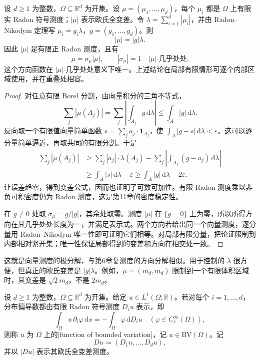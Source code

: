 \begin{proposition}\label{b1:prop:vector-measure-polar}
设 \(d\ge1\) 为整数，\(\Omega\subseteq\mathbb R^d\) 为开集。设 \(\mu=(\mu_1,\ldots,\mu_d)\)，每个 \(\mu_i\) 都是 \(\Omega\) 上有限实 Radon 符号测度；\(|\mu|\) 表示欧氏全变差。令 \(\lambda=\sum_{i=1}^d|\mu_i|\)，并由 Radon–Nikodym 定理写 \(\mu_i=g_i\lambda\)，\(g=(g_1,\ldots,g_d)\)。则
\[
 |\mu|=|g|\lambda.
\]
因此 \(|\mu|\) 是有限正 Radon 测度，且有
\[
 \mu=\sigma_\mu|\mu|,\qquad |\sigma_\mu|=1
 \quad |\mu|\text{-几乎处处}.
\]
这个方向函数在 \(|\mu|\)-几乎处处意义下唯一。上述结论在局部有限情形可逐个内部区域使用，并在重叠处相容。
\end{proposition}
\begin{proof}
对任意有限 Borel 分割，由向量积分的三角不等式，
\[
 \sum_j|\mu(A_j)|=\sum_j\left|\int_{A_j}g\,\mathrm d\lambda\right|
 \le\int_A|g|\,\mathrm d\lambda.
\]
反向取一个有限值向量简单函数 \(s=\sum_j a_j\cdot\mathbf1_{A_j}\)，使
\(\int_A|g-s|\,\mathrm d\lambda<\varepsilon\)。这可以逐分量简单逼近，再取共同的有限分割。于是
\[
 \begin{aligned}
 \sum_j|\mu(A_j)|
 &\ge\sum_j |a_j|\cdot \lambda(A_j)
           -\sum_j\left|\int_{A_j}(g-a_j)\,\mathrm d\lambda\right|\\
 &\ge\int_A|s|\,\mathrm d\lambda-\varepsilon
 \ge\int_A|g|\,\mathrm d\lambda-2\varepsilon.
 \end{aligned}
\]
让误差趋零，得到变差公式，因而也证明了可数可加性。有限 Radon 测度乘以非负可积密度仍为 Radon 测度，这是第11章的密度稳定性。

在 \(g\ne0\) 处取 \(\sigma_\mu=g/|g|\)，其余处取零。测度 \(|\mu|\) 在 \(\{g=0\}\) 上为零，所以所得方向在其几乎处处长度为一，并满足表示式。两个方向若给出同一个向量测度，逐分量用 Radon–Nikodym 唯一性即可证明它们相等。对局部有限分量，把论证限制到内部相对紧开集；唯一性保证局部得到的变差和方向在相交处一致。
\end{proof}

这就是向量测度的极分解，与第6章复测度的方向分解相似。用于控制的 \(\lambda\) 很方便，但真正的欧氏变差是 \(|g|\lambda\)。例如，\(\mu=(m_d,m_d)\) 限制到一个有限体积区域时，其变差是 \(\sqrt2m_d\)，不是 \(2m_d\)。

\begin{definition}\label{b1:def:bv-function}
设 \(d\ge1\) 为整数，\(\Omega\subseteq\mathbb R^d\) 为开集。给定 \(u\in L^1(\Omega;\mathbb R)\)。若对每个 \(i=1,\ldots,d\)，分布偏导数都由有限 Radon 符号测度 \(D_i u\) 表示，即
\[
 \int_\Omega u\,\partial_i\varphi\,\mathrm dx
 =-\int_\Omega\varphi\,\mathrm dD_i u
 \quad(\varphi\in C_c^\infty(\Omega)),
\]
则称 \(u\) 为 \(\Omega\) 上的[function of bounded variation]，记 \(u\in \mathrm{BV}(\Omega)\)。记
\[
 Du\coloneqq(D_1u,\ldots,D_du),
\]
并以 \(|Du|\) 表示其欧氏全变差测度。
\end{definition}

